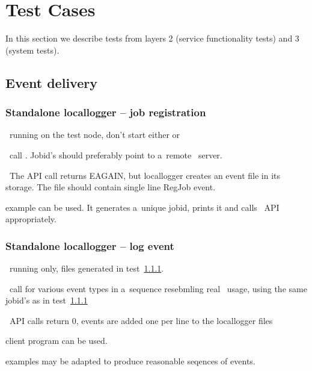 \section{Test Cases}

In this section we describe tests from layers 2 (service functionality tests)
and 3 (system tests). 



\subsection{Event delivery}

\subsubsection{Standalone locallogger -- job registration}
\label{reg}
\req\ running  on the test node, don't start either
 or 

\how\ call . Jobid's should preferably point
to a~remote \LB\ server.

\result\ The API call returns EAGAIN, but locallogger creates an event file
in its storage.
The file should contain single line RegJob event.

\begin{hints}
 example can be used. It generates a~unique jobid,
prints it and calls \LB\ API appropriately.
\end{hints}

\subsubsection{Standalone locallogger -- log event}
\label{log}
\req\ running  only, files generated in test~\ref{reg}.

\how\ call  for various event types in a~sequence
resebmling real \LB\ usage, using the same jobid's as in test~\ref{reg}

\result\ API calls return 0, events are added one per line to the locallogger files

\begin{hints}
 client program can be used.

 examples may be adapted to produce reasonable seqences
of events.
\end{hints}

